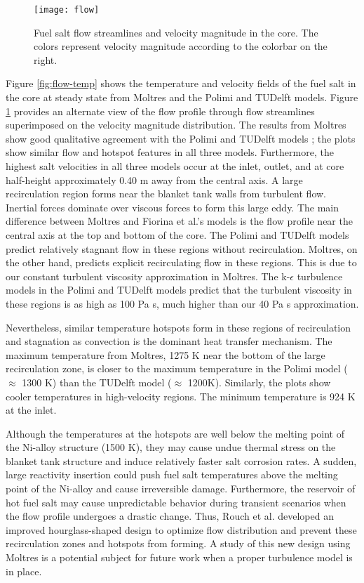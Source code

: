 \begin{figure}[t!]
    \centering
    \texttt{[image: flow]}
    \caption{Fuel salt flow streamlines and velocity magnitude in the core.
    The colors represent velocity magnitude according to the colorbar on the
    right.}
    \label{fig:flow}
\end{figure}

Figure \ref{fig:flow-temp} shows the temperature and velocity fields of the
fuel salt in the core at steady state from Moltres and the Polimi and TUDelft
models. Figure \ref{fig:flow} provides an alternate view of the flow profile
through flow streamlines superimposed on the velocity magnitude distribution.
The results from Moltres show good qualitative agreement with the Polimi and
TUDelft models \cite{fiorina_modelling_2014}; the plots show similar
flow and hotspot features in all three models. Furthermore, the highest salt
velocities in all three models occur at the inlet, outlet, and at core
half-height approximately 0.40 m away from the central axis. A large
recirculation region forms near the blanket tank walls from turbulent flow.
Inertial forces dominate over viscous forces to form this large eddy. The main
difference between Moltres and Fiorina et al.'s models is the flow profile
near the central axis at the top and bottom of the core.
The Polimi and TUDelft models predict relatively stagnant flow in these
regions without recirculation. Moltres, on the other hand, predicts explicit
recirculating flow in these regions. This is due to our constant turbulent
viscosity approximation in Moltres. The k-$\epsilon$ turbulence models in the
Polimi and TUDelft models predict that the turbulent viscosity in these
regions is as high as 100 Pa s, much higher than our 40 Pa s approximation.

Nevertheless, similar temperature hotspots form in these regions of
recirculation and stagnation as convection is the dominant heat transfer
mechanism. The maximum temperature from Moltres, 1275 K near the bottom of the
large recirculation zone, is closer to the maximum temperature in the Polimi
model ($\approx$ 1300 K) than the TUDelft model ($\approx$ 1200K). Similarly,
the plots show cooler temperatures in high-velocity regions. The minimum
temperature is 924 K at the inlet. 

Although the temperatures at the hotspots are well below the melting point of the Ni-alloy structure (1500 K), they may cause undue thermal stress on the
blanket tank structure and induce relatively faster salt corrosion rates. A
sudden, large reactivity insertion could push fuel salt temperatures above the
melting point of the Ni-alloy and cause irreversible damage. Furthermore,
the reservoir of hot fuel salt may cause unpredictable behavior during
transient scenarios when the flow profile undergoes a drastic change.
Thus, Rouch et al. \cite{rouch_preliminary_2014} developed an improved
hourglass-shaped design to optimize flow distribution and prevent these
recirculation zones and hotspots from forming. A study of this new design
using Moltres is a potential subject for future work when a proper turbulence
model is in place.


